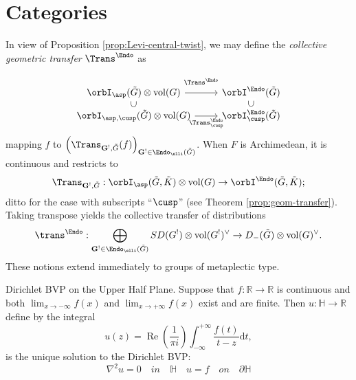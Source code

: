\documentclass[11pt, a3paper, openany]{article}
\newcommand{\mes}{\operatorname{vol}}
\theoremstyle{remark}
\newtheorem{remark}[]{\bfseries Remark}          %
\theoremstyle{remark}
\theoremstyle{remark}
\newenvironment{Proof of claim}
  {\begin{proof}[\normalfont \textbf{Proof of claim}]}
  {\end{proof}}
\theoremstyle{definition}
\theoremstyle{remark}
\theoremstyle{plain}
\begin{document}
\section{Categories}
\begin{Definition}
	In view of Proposition \ref{prop:Levi-central-twist}, we may define the \emph{collective geometric transfer} $\Trans^{\Endo}$ as
	\begin{equation*}\begin{tikzcd}[row sep=tiny]
		\orbI_{\asp}(\tilde{G}) \otimes \mes(G) \arrow[r, "{\Trans^{\Endo}}" inner sep=0.8em] & \orbI^{\Endo}(\tilde{G}) \\
		\orbI_{\asp, \cusp}(\tilde{G}) \otimes \mes(G) \arrow[phantom, u, "\subset" description, sloped] \arrow[r, "{\Trans^{\Endo}_{\cusp}}"'] & \orbI^{\Endo}_{\cusp}(\tilde{G}) \arrow[phantom, u, "\subset" description, sloped]
	\end{tikzcd}\end{equation*}mapping $f$ to $\left( \Trans_{\mathbf{G}^!, \tilde{G}}(f)\right)_{\mathbf{G}^! \in \Endo_{\elli}(\tilde{G})}$. When $F$ is Archimedean, it is continuous and restricts to
	\[ \Trans_{\mathbf{G}^!, \tilde{G}}: \orbI_{\asp}(\tilde{G}, \tilde{K}) \otimes \mes(G) \to \orbI^{\Endo}(\tilde{G}, \tilde{K}); \]
	ditto for the case with subscripts ``$\cusp$'' (see Theorem \ref{prop:geom-transfer}).
	Taking transpose yields the collective transfer of distributions
	\[ \trans^{\Endo}: \bigoplus_{\mathbf{G}^! \in \Endo_{\elli}(\tilde{G})} SD(G^!) \otimes \mes(G^!)^\vee \to D_-(\tilde{G}) \otimes \mes(G)^\vee . \]
These notions extend immediately to groups of metaplectic type.
\end{Definition}

\begin{Proposition}{Dirichlet BVP on the Upper Half Plane.}{}
Suppose that $f: \mathbb{R} \rightarrow \mathbb{R}$ is continuous and both $\lim_{x \to -\infty} f(x) $ and $\lim_{x \to +\infty} f(x) $ exist and are finite. Then $u: \mathbb{H} \rightarrow \mathbb{R}$ define by the integral 
$$ u(z) = \operatorname{Re}(\frac{1}{\pi i}) \int_{-\infty}^{+\infty} \frac{f(t)}{t-z}\mathrm{d}t, $$ is the unique solution to the Dirichlet BVP:$$\nabla^{2}u=0 \quad in \quad \mathbb{H} \quad u=f \quad on \quad \partial \mathbb{H} $$
\end{Proposition}
\end{document}
